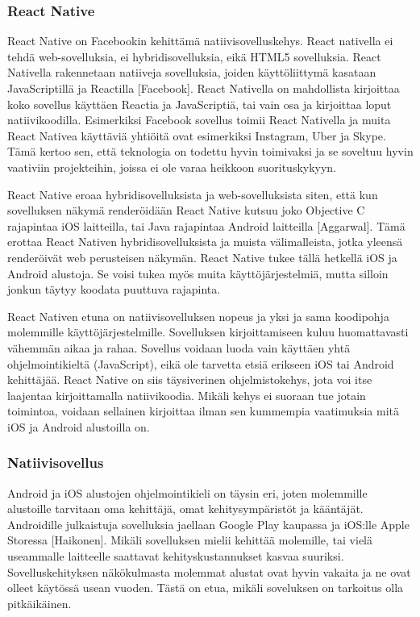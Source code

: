 \documentclass{tktltiki}
\begin{document}
\subsubsection{React Native}

React Native on Facebookin kehittämä natiivisovelluskehys. React nativella ei tehdä web-sovelluksia, ei hybridisovelluksia, eikä HTML5 sovelluksia. React Nativella rakennetaan natiiveja sovelluksia, joiden käyttöliittymä kasataan JavaScriptillä ja Reactilla [Facebook]. React Nativella on mahdollista kirjoittaa koko sovellus käyttäen Reactia ja JavaScriptiä, tai vain osa ja kirjoittaa loput natiivikoodilla. Esimerkiksi Facebook sovellus toimii React Nativella ja muita React Nativea käyttäviä yhtiöitä ovat esimerkiksi Instagram, Uber ja Skype. Tämä kertoo sen, että teknologia on todettu hyvin toimivaksi ja se soveltuu hyvin vaativiin projekteihin, joissa ei ole varaa heikkoon suorituskykyyn.

React Native eroaa hybridisovelluksista ja web-sovelluksista siten, että kun sovelluksen näkymä renderöidään React Native kutsuu joko Objective C rajapintaa iOS laitteilla, tai Java rajapintaa Android laitteilla [Aggarwal]. Tämä erottaa React Nativen hybridisovelluksista ja muista välimalleista, jotka yleensä renderöivät web perusteisen näkymän. React Native tukee tällä hetkellä iOS ja Android alustoja. Se voisi tukea myös muita käyttöjärjestelmiä, mutta silloin jonkun täytyy koodata puuttuva rajapinta.  

React Nativen etuna on natiivisovelluksen nopeus ja yksi ja sama koodipohja molemmille käyttöjärjestelmille. Sovelluksen kirjoittamiseen kuluu huomattavasti vähemmän aikaa ja rahaa. Sovellus voidaan luoda vain käyttäen yhtä ohjelmointikieltä (JavaScript), eikä ole tarvetta etsiä erikseen iOS tai Android kehittäjää. React Native on siis täysiverinen ohjelmistokehys, jota voi itse laajentaa kirjoittamalla natiivikoodia. Mikäli kehys ei suoraan tue jotain toimintoa, voidaan sellainen kirjoittaa ilman sen kummempia vaatimuksia mitä iOS ja Android alustoilla on.

\subsubsection{Natiivisovellus}

Android ja iOS alustojen ohjelmointikieli on täysin eri, joten molemmille alustoille tarvitaan oma kehittäjä, omat kehitysympäristöt ja kääntäjät. Androidille julkaistuja sovelluksia jaellaan Google Play kaupassa ja iOS:lle Apple Storessa [Haikonen]. Mikäli sovelluksen mielii kehittää molemille, tai vielä useammalle laitteelle saattavat kehityskustannukset kasvaa suuriksi. Sovelluskehityksen näkökulmasta molemmat alustat ovat hyvin vakaita ja ne ovat olleet käytössä usean vuoden. Tästä on etua, mikäli soveluksen on tarkoitus olla pitkäikäinen.  
\end{document}
